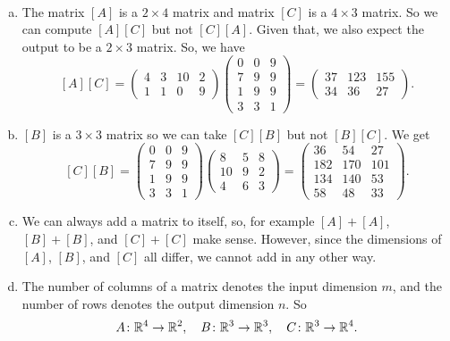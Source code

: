 \documentclass[12pt]{article} %
\begin{document}
\begin{solution}~
\begin{enumerate}[(a)]
    \item The matrix $[A]$ is a $2\times 4$ matrix and matrix $[C]$ is a $4 \times 3$ matrix.  So we can compute $[A][C]$ but not $[C][A]$.  Given that, we also expect the output to be a $2 \times 3$ matrix. So, we have
    \[
    [A][C] = \begin{pmatrix} 4 & 3 & 10 & 2 \\ 1 & 1 & 0 & 9 \end{pmatrix}\begin{pmatrix} 0 & 0 & 9 \\ 7 & 9 & 9 \\ 1 & 9 & 9 \\ 3 & 3 & 1\end{pmatrix} = \begin{pmatrix} 37 & 123 & 155 \\ 34 & 36 & 27 \end{pmatrix}.
    \]

    \item $[B]$ is a $3 \times 3$ matrix so we can take $[C][B]$ but not $[B][C]$.  We get
    \[
        [C][B] = \begin{pmatrix} 0 & 0 & 9 \\ 7 & 9 & 9 \\ 1 & 9 & 9 \\ 3 & 3 & 1\end{pmatrix} \begin{pmatrix} 8 & 5 & 8 \\ 10 & 9 & 2 \\ 4 & 6 &3 \end{pmatrix} = \begin{pmatrix} 36 & 54 & 27 \\ 182 & 170 & 101 \\ 134 & 140 & 53 \\ 58 & 48 & 33 \end{pmatrix}.
    \]
    \item We can always add a matrix to itself, so, for example $[A]+[A]$, $[B]+[B]$, and $[C]+[C]$ make sense. However, since the dimensions of $[A]$, $[B]$, and $[C]$ all differ, we cannot add in any other way.
    \item The number of columns of a matrix denotes the input dimension $m$, and the number of rows denotes the output dimension $n$.  So
    \[
        A \colon \mathbb{R}^4 \to \mathbb{R}^2, \quad B \colon \mathbb{R}^3 \to \mathbb{R}^3, \quad C \colon \mathbb{R}^3 \to \mathbb{R}^4.
    \]
\end{enumerate}
\end{solution}
\end{document}
